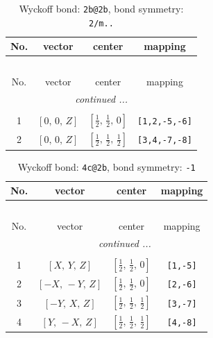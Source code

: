 \documentclass[fleqn,8pt]{jsarticle}
\begin{document}
\renewcommand{\arraystretch}{1.2}
\begin{longtable}{cccc}
\caption{Wyckoff bond: {\tt 2b@2b}, bond symmetry: {\tt 2/m..}}
 \\
 \hline \hline
No. & vector & center & mapping \\ \hline \endfirsthead

\multicolumn{3}{l}{\tablename\ \thetable{}} \\
 \hline \hline
No. & vector & center & mapping \\ \hline \endhead

 \hline \hline
\multicolumn{3}{r}{\footnotesize\it continued ...} \\ \endfoot

 \hline \hline
\multicolumn{3}{r}{} \\ \endlastfoot

1 & $\left[ 0,\, 0,\, Z \right]$ & $\left[ \frac{1}{2},\, \frac{1}{2},\, 0 \right]$ & {\tt [1,2,-5,-6]} \\ \hline
2 & $\left[ 0,\, 0,\, Z \right]$ & $\left[ \frac{1}{2},\, \frac{1}{2},\, \frac{1}{2} \right]$ & {\tt [3,4,-7,-8]} \\
\end{longtable}
\renewcommand{\arraystretch}{1.2}
\begin{longtable}{cccc}
\caption{Wyckoff bond: {\tt 4c@2b}, bond symmetry: {\tt -1}}
 \\
 \hline \hline
No. & vector & center & mapping \\ \hline \endfirsthead

\multicolumn{3}{l}{\tablename\ \thetable{}} \\
 \hline \hline
No. & vector & center & mapping \\ \hline \endhead

 \hline \hline
\multicolumn{3}{r}{\footnotesize\it continued ...} \\ \endfoot

 \hline \hline
\multicolumn{3}{r}{} \\ \endlastfoot

1 & $\left[ X,\, Y,\, Z \right]$ & $\left[ \frac{1}{2},\, \frac{1}{2},\, 0 \right]$ & {\tt [1,-5]} \\ \hline
2 & $\left[ - X,\, - Y,\, Z \right]$ & $\left[ \frac{1}{2},\, \frac{1}{2},\, 0 \right]$ & {\tt [2,-6]} \\ \hline
3 & $\left[ - Y,\, X,\, Z \right]$ & $\left[ \frac{1}{2},\, \frac{1}{2},\, \frac{1}{2} \right]$ & {\tt [3,-7]} \\ \hline
4 & $\left[ Y,\, - X,\, Z \right]$ & $\left[ \frac{1}{2},\, \frac{1}{2},\, \frac{1}{2} \right]$ & {\tt [4,-8]} \\
\end{longtable}
\end{document}
